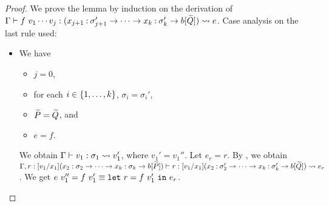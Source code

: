 \begin{proof}
We prove the lemma by induction on the derivation of
\(\Gamma \vdash f\ v_1\cdots v_j : (x_{j+1}\mathbin{:}\sigma_{j+1}' \to \cdots \to x_k\mathbin{:}\sigma_k' \to b[\widetilde{Q}]) \leadsto e\).
Case analysis on the last rule used:
\begin{itemize}
\item[] 
We have
\begin{itemize}
\item \(j=0\),
\item for each \(i \in \{1,\dots,k\}\), \(\sigma_i=\sigma_i'\),
\item \(\widetilde{P}=\widetilde{Q}\), and
\item \(e=f\).
\end{itemize}
We obtain
\(\Gamma \vdash v_1 : \sigma_1 \leadsto v_1'\), where
\(v_1'=v_1''\).
%
Let \(e_r=r\).
By , we obtain
\(\Gamma,r:[v_1/x_1](x_2:\sigma_2 \to \cdots \to x_k:\sigma_k \to b[\widetilde{P}]) \vdash r : [v_1/x_1](x_2\mathbin{:}\sigma_2' \to \cdots \to x_k\mathbin{:}\sigma_k' \to b[\widetilde{Q}]) \leadsto e_r\).
%
We get \(e\ v_1''=f\ v_1' \equiv \mathtt{let~}r=f\ v_1'\mathtt{~in~}e_r\).


\end{itemize}
\end{proof}
